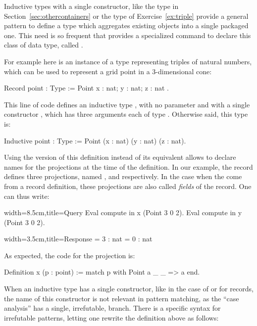 Inductive types with a single constructor, like the type  in
Section~\ref{sec:othercontainers} or the type  of
Exercise~\ref{ex:triple} provide a general pattern to define a type
which aggregates existing objects into a single packaged one. This
need is so frequent that \Coq{} provides a specialized command
to declare this class of data type, called .

For example here is an instance of a type representing triples of
natural numbers, which can be used to represent a grid point in a
3-dimensional cone:

\begin{coq}{}{}
Record point : Type := Point { x : nat; y : nat; z : nat }.
\end{coq}
This line of code defines an inductive type , with no
parameter and with a single constructor , which has three
arguments each of type . Otherwise said, this type is:

\begin{coq}{}{}
Inductive point : Type := Point (x : nat) (y : nat) (z : nat).
\end{coq}

Using the  version of this definition instead of its
equivalent  allows to declare names for the projections
at the time of the definition. In our example, the record 
defines three projections, named ,  and 
respectively. In the case when the come from a record definition,
these projections are also called \emph{fields} of the record.
One can thus write:

\begin{coq}{}{width=8.5cm,title=Query}
Eval compute in x (Point 3 0 2).
Eval compute in y (Point 3 0 2).
\end{coq}{}{}
\begin{coqout}{}{width=3.5cm,title=Response}
= 3 : nat
= 0 : nat
\end{coqout}{}{}
As expected, the code for the  projection is:

\begin{coq}{}{}
Definition x (p : point) := match p with Point a _ _ => a end.
\end{coq}

When an inductive type has a single constructor, like in the case of
 or for records, the name of this constructor is not relevant
in pattern matching, as the ``case analysis'' has a single, irrefutable,
branch. There is a specific syntax for irrefutable patterns, letting
one rewrite the definition above as follows:

